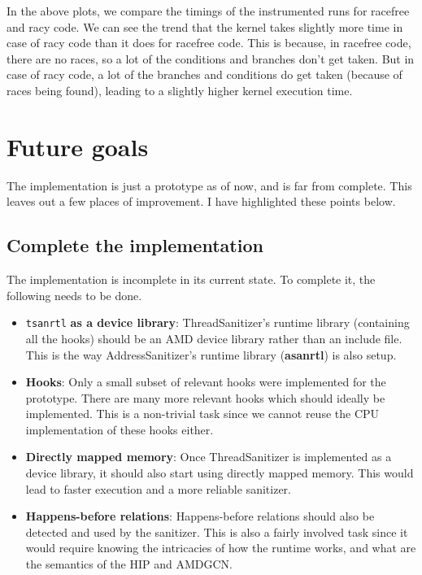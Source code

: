 \documentclass{btp}
\begin{document}
In the above plots, we compare the timings of the instrumented runs for racefree and racy code. We can see the trend that the kernel takes slightly more time in case of racy code than it does for racefree code. This is because, in racefree code, there are no races, so a lot of the conditions and branches don't get taken. But in case of racy code, a lot of the branches and conditions do get taken (because of races being found), leading to a slightly higher kernel execution time.

\section{Future goals}

The implementation is just a prototype as of now, and is far from complete. This leaves out a few places of improvement. I have highlighted these points below.

\subsection{Complete the implementation}

The implementation is incomplete in its current state. To complete it, the following needs to be done.

\begin{itemize}
	\item \texttt{tsanrtl} \textbf{as a device library}: ThreadSanitizer's runtime library (containing all the hooks) should be an AMD device library rather than an include file. This is the way AddressSanitizer's runtime library (\textbf{asanrtl}) is also setup.
	\item \textbf{Hooks}: Only a small subset of relevant hooks were implemented for the prototype. There are many more relevant hooks which should ideally be implemented. This is a non-trivial task since we cannot reuse the CPU implementation of these hooks either.
	\item \textbf{Directly mapped memory}: Once ThreadSanitizer is implemented as a device library, it should also start using directly mapped memory. This would lead to faster execution and a more reliable sanitizer.
	\item \textbf{Happens-before relations}: Happens-before relations should also be detected and used by the sanitizer. This is also a fairly involved task since it would require knowing the intricacies of how the runtime works, and what are the semantics of the HIP and AMDGCN.
\end{itemize}
\end{document}
